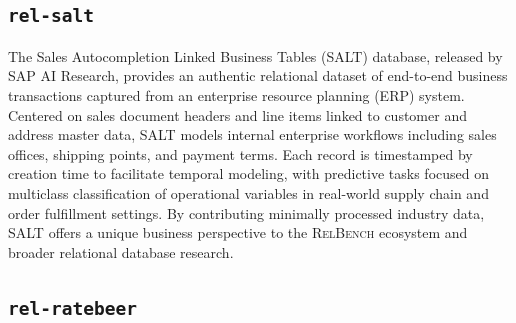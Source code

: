 \documentclass{article} %
\newcommand{\relbench}{\textsc{RelBench}\xspace}
\newcommand{\salt}{\texttt{rel-salt}\xspace}
\newcommand{\ratebeer}{\texttt{rel-ratebeer}\xspace}
\begin{document}
\subsection{\salt}

The Sales Autocompletion Linked Business Tables (SALT) \citep{sap-salt} database, released by SAP AI Research, provides an authentic relational dataset of end-to-end business transactions captured from an enterprise resource planning (ERP) system. Centered on sales document headers and line items linked to customer and address master data, SALT models internal enterprise workflows including sales offices, shipping points, and payment terms. Each record is timestamped by creation time to facilitate temporal modeling, with predictive tasks focused on multiclass classification of operational variables in real-world supply chain and order fulfillment settings. By contributing minimally processed industry data, SALT offers a unique business perspective to the \relbench ecosystem and broader relational database research.



\subsection{\ratebeer}
\end{document}
